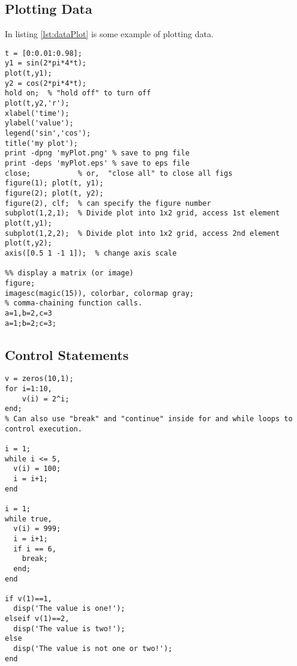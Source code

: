\subsection{Plotting Data}
In listing \ref{lst:dataPlot} is some example of plotting data.
\begin{lstlisting}[label=lst:dataPlot, caption= Plotting Data]
%% plotting
t = [0:0.01:0.98];
y1 = sin(2*pi*4*t); 
plot(t,y1);
y2 = cos(2*pi*4*t);
hold on;  % "hold off" to turn off
plot(t,y2,'r');
xlabel('time');
ylabel('value');
legend('sin','cos');
title('my plot');
print -dpng 'myPlot.png' % save to png file
print -deps 'myPlot.eps' % save to eps file
close;           % or,  "close all" to close all figs
figure(1); plot(t, y1);
figure(2); plot(t, y2);
figure(2), clf;  % can specify the figure number
subplot(1,2,1);  % Divide plot into 1x2 grid, access 1st element
plot(t,y1);
subplot(1,2,2);  % Divide plot into 1x2 grid, access 2nd element
plot(t,y2);
axis([0.5 1 -1 1]);  % change axis scale

%% display a matrix (or image) 
figure;
imagesc(magic(15)), colorbar, colormap gray;
% comma-chaining function calls.  
a=1,b=2,c=3
a=1;b=2;c=3;
\end{lstlisting}


\subsection{Control Statements}
\begin{lstlisting}[label=lst:ctrlState, caption=Control Statements in Octave]
v = zeros(10,1);
for i=1:10, 
    v(i) = 2^i;
end;
% Can also use "break" and "continue" inside for and while loops to control execution.

i = 1;
while i <= 5,
  v(i) = 100; 
  i = i+1;
end

i = 1;
while true, 
  v(i) = 999; 
  i = i+1;
  if i == 6,
    break;
  end;
end

if v(1)==1,
  disp('The value is one!');
elseif v(1)==2,
  disp('The value is two!');
else
  disp('The value is not one or two!');
end
\end{lstlisting}

